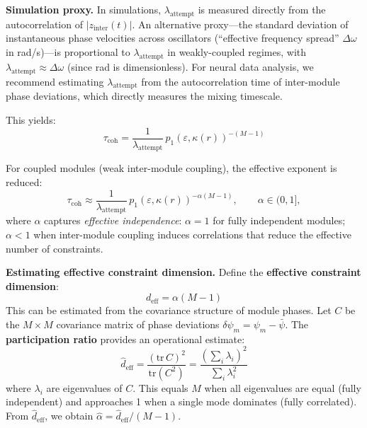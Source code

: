 \documentclass[12pt]{article}
\begin{document}
\textbf{Simulation proxy.} In simulations, $\lambda_{\mathrm{attempt}}$ is measured directly from the autocorrelation of $|z_{\mathrm{inter}}(t)|$. An alternative proxy---the standard deviation of instantaneous phase velocities across oscillators (``effective frequency spread'' $\Delta\omega$ in rad/s)---is proportional to $\lambda_{\mathrm{attempt}}$ in weakly-coupled regimes, with $\lambda_{\mathrm{attempt}} \approx \Delta\omega$ (since rad is dimensionless). For neural data analysis, we recommend estimating $\lambda_{\mathrm{attempt}}$ from the autocorrelation time of inter-module phase deviations, which directly measures the mixing timescale.

This yields:
\begin{equation}\label{eq:coh-time-exact}
\tau_{\mathrm{coh}} = \frac{1}{\lambda_{\mathrm{attempt}}}\,p_1(\varepsilon, \kappa(r))^{-(M-1)}
\end{equation}

For coupled modules (weak inter-module coupling), the effective exponent is reduced:
\begin{equation}\label{eq:coh-time}
\boxed{\tau_{\mathrm{coh}} \approx \frac{1}{\lambda_{\mathrm{attempt}}}\,p_1(\varepsilon, \kappa(r))^{-\alpha(M-1)}},\qquad \alpha\in(0,1],
\end{equation}
where $\alpha$ captures \emph{effective independence}: $\alpha = 1$ for fully independent modules; $\alpha < 1$ when inter-module coupling induces correlations that reduce the effective number of constraints.

\textbf{Estimating effective constraint dimension.} Define the \textbf{effective constraint dimension}:
\[
d_{\mathrm{eff}} = \alpha(M-1)
\]
This can be estimated from the covariance structure of module phases. Let $C$ be the $M \times M$ covariance matrix of phase deviations $\delta\psi_m = \psi_m - \bar{\psi}$. The \textbf{participation ratio} provides an operational estimate:
\begin{equation}\label{eq:deff-estimator}
\hat{d}_{\mathrm{eff}} = \frac{(\mathrm{tr}\, C)^2}{\mathrm{tr}(C^2)} = \frac{\left(\sum_i \lambda_i\right)^2}{\sum_i \lambda_i^2}
\end{equation}
where $\lambda_i$ are eigenvalues of $C$. This equals $M$ when all eigenvalues are equal (fully independent) and approaches 1 when a single mode dominates (fully correlated). From $\hat{d}_{\mathrm{eff}}$, we obtain $\hat{\alpha} = \hat{d}_{\mathrm{eff}} / (M-1)$.
\end{document}
